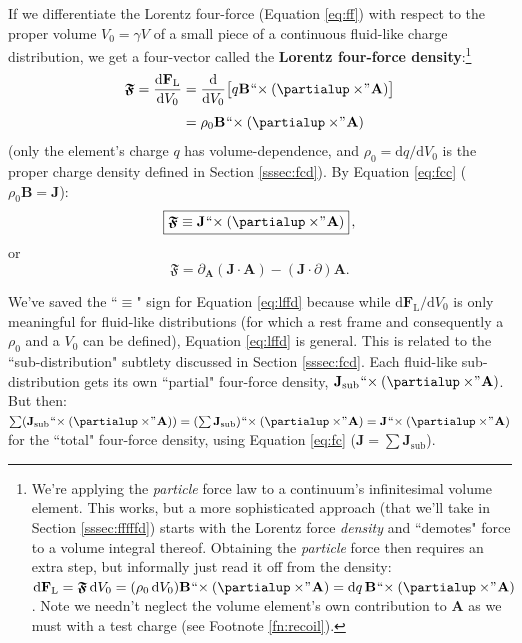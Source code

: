 \documentclass[12pt]{article}
\renewcommand{\vv}[1]{\mathbf{#1}}
\newcommand{\dd}[1]{\mathrm{d}#1}
\begin{document}
If we differentiate the Lorentz four-force (Equation \ref{eq:ff}) with respect to the proper volume ${V_0 = \gamma V}$ of a small piece of a continuous fluid-like charge distribution, we get a four-vector called the \textbf{Lorentz four-force density}:\footnote{\label{fn:ffd}We're applying the \emph{particle} force law to a continuum's infinitesimal volume element. This works, but a more sophisticated approach (that we'll take in Section \ref{sssec:fffffd}) starts with the Lorentz force \emph{density} and ``demotes" force to a volume integral thereof. Obtaining the \emph{particle} force then requires an extra step, but informally just read it off from the density: ${\dd \vv F_{\mathrm{L}} = \bm{\mathfrak{F}} \, \dd V_0 = (\rho_0 \, \dd V_0) \vv B \mkern1mu `` \mkern-4mu \times (\partialup \times \mkern-4mu " \mkern1mu \vv A) = \dd q \, \vv B \mkern1mu `` \mkern-4mu \times (\partialup \times \mkern-4mu " \mkern1mu \vv A)}$. Note we needn't neglect the volume element's own contribution to $\vv A$ as we must with a test charge (see Footnote \ref{fn:recoil}).}
\begin{equation*}
\begin{split}
\bm{\mathfrak{F}} = \dfrac{\dd \vv F_{\mathrm{L}}}{\dd V_0} &= \dfrac{\dd}{\dd V_0} \bigl[ q \vv B \mkern1mu `` \mkern-4mu \times (\partialup \times \mkern-4mu " \mkern1mu \vv A) \bigr] \\[3pt]
&= \rho_0 \vv B \mkern1mu `` \mkern-4mu \times (\partialup \times \mkern-4mu " \mkern1mu \vv A)
\end{split}
\end{equation*}
(only the element's charge $q$ has volume-dependence, and ${\rho_0 = \dd q / \dd V_0}$ is the proper charge density defined in Section \ref{sssec:fcd}). By Equation \ref{eq:fcc} ($\rho_0 \vv B = \vv J$):
\begin{equation}\label{eq:lffd}
\boxed{ \bm{\mathfrak{F}} \equiv \vv J \mkern1mu `` \mkern-4mu \times (\partialup \times \mkern-4mu " \mkern1mu \vv A) } \, ,
\end{equation}
or
\begin{equation*}
\bm{\mathfrak{F}} = \partialup_{\vv A} (\vv J \cdot \vv A) - ( \vv J \cdot \partialup) \vv A .
\end{equation*}

We've saved the ``$\equiv$" sign for Equation \ref{eq:lffd} because while $\dd \vv F_{\mathrm{L}} / \dd V_0$ is only meaningful for fluid-like distributions (for which a rest frame and consequently a $\rho_0$ and a $V_0$ can be defined), Equation \ref{eq:lffd} is general. This is related to the ``sub-distribution" subtlety discussed in Section \ref{sssec:fcd}. Each fluid-like sub-distribution gets its own ``partial" four-force density, ${\vv J_{\mathrm{sub}} \mkern1mu `` \mkern-4mu \times (\partialup \times \mkern-4mu " \mkern1mu \vv A)}$. But then: ${ \sum ( \vv J_{\mathrm{sub}} \mkern1mu `` \mkern-4mu \times (\partialup \times \mkern-4mu " \mkern1mu \vv A) ) = (\sum \vv J_{\mathrm{sub}}) \mkern1mu `` \mkern-4mu \times (\partialup \times \mkern-4mu " \mkern1mu \vv A) = \vv J \mkern1mu `` \mkern-4mu \times (\partialup \times \mkern-4mu " \mkern1mu \vv A)}$ for the ``total" four-force density, using Equation \ref{eq:fc} ($\vv J = \sum \vv J_{\mathrm{sub}}$).
\end{document}
